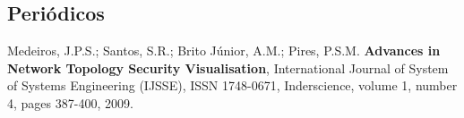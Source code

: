 \subsection*{Periódicos}
\begin{compactenum}

\item Medeiros, J.P.S.; Santos, S.R.; Brito Júnior, A.M.; Pires, P.S.M.
{\bf Advances in Network Topology Security Visualisation},
International Journal of System of Systems Engineering (IJSSE),
ISSN 1748-0671,
Inderscience, volume 1, number 4, pages 387-400, 2009.

\end{compactenum}

